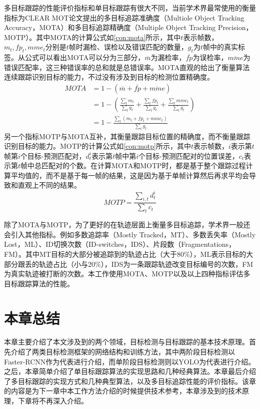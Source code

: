 多目标跟踪的性能评价指标和单目标跟踪有很大不同，当前学术界最常使用的衡量指标为CLEAR MOT\cite{bernardin2008evaluating}论文提出的多目标追踪准确度（Multiole Object Tracking Accuracy，MOTA）和多目标追踪精确度（Multiple Object Tracking Precision，MOTP）。其中MOTA的计算公式如\ref{con:mota}所示，其中$t$表示帧数，$m_t, fp_t, mme_t$分别是$t$帧时漏检、误检以及错误匹配的数量，$g_t$为$t$帧中的真实标签。从公式可以看出MOTA可以分为三部分，$\overline{m}$为漏检率，$\overline{fp}$为误检率，$\overline{mme}$为错误匹配率，这三种错误率的总和就是总错误率。MOTA直观的给出了衡量算法连续跟踪识别目标的能力，不过没有涉及到目标的检测位置精确度。
\begin{equation}
\begin{split}
MOTA & = 1 - (\overline{m} + \overline{fp} + \overline{mme})\\
& = 1 - \left(\frac{\sum_t m_t}{\sum_t g_t} + \frac{\sum_t fp_t}{\sum_t g_t} + \frac{\sum_t mme_t}{\sum_t g_t} \right)\\
& = 1 - \frac{\sum_t (m_t + fp_t + mme_t)}{\sum_t g_t}
\end{split}
\label{con:mota}
\end{equation}
另一个指标MOTP与MOTA互补，其衡量跟踪目标位置的精确度，而不衡量跟踪识别目标的能力。MOTP的计算公式如\ref{con:motp}所示，其中$t$表示帧数，$i$表示第$t$帧第$i$个目标-预测匹配对，$d^i_t$表示第$t$帧中第$i$个目标-预测匹配对的位置误差，$c_t$表示第$t$帧中总匹配对的个数。在计算MOTA和MOTP时，都是基于整个跟踪过程计算平均值的，而不是基于每一帧的结果，这是因为基于单帧计算然后再求平均会导致和直观上不同的结果。
\begin{equation}
MOTP = \frac{\sum_{i,t} d^i_t}{\sum_t c_t}
\label{con:motp}
\end{equation}

除了MOTA与MOTP，为了更好的在轨迹层面上衡量多目标追踪，学术界一般还会引入其他指标。例如多数追踪率（Mostly Tracked，MT）、多数丢失率（Mostly Lost，ML）、ID切换次数（ID-switches，IDS）、片段数（Fragmentations，FM）。其中MT目标的大部分被追踪到的轨迹占比（大于80\%），ML表示目标的大部分跟丢的轨迹占比（小与20\%），IDS为一条跟踪轨迹改变目标编号的次数，FM为真实轨迹被打断的次数。本工作使用MOTA、MOTP以及以上四种指标评估多目标跟踪算法的性能。

\section{本章总结}
\label{tech_conclusion}
本章主要介绍了本文涉及到的两个领域，目标检测与目标跟踪的基本技术原理。首先介绍了两类目标检测框架的网络结构和训练方法，其中两阶段目标检测以Faster-RCNN作为代表进行介绍，而单阶段目标检测则以YOLO为代表进行介绍。之后，本章简单介绍了单目标跟踪算法的实现思路和几种经典算法。本章最后介绍了多目标跟踪的实现方式和几种典型算法，以及多目标追踪性能的评价指标。该章的内容是为下一章中本工作方法介绍的时候提供技术参考，本章涉及到的技术原理，下章将不再深入介绍。

\ifprint
	\newpage
	\thispagestyle{empty}
	\mbox{}
	
	\clearpage
	\setcounter{page}{10}
\fi